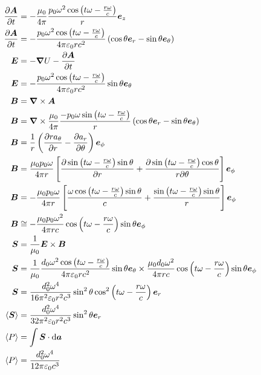 \begin{align}
    \frac{\partial \boldsymbol{A}}{\partial t}&=-\frac{\mu_0}{4\pi}\frac{p_0\omega^2\cos\left(t\omega-\frac{r\omega}{c}\right)}{r}\boldsymbol{e}_z\nonumber\\
    \frac{\partial \boldsymbol{A}}{\partial t}&=-\frac{p_0\omega^2\cos\left(t\omega-\frac{r\omega}{c}\right)}{4\pi\varepsilon_0 rc^2}\left(\cos\theta\boldsymbol{e}_r-\sin\theta\boldsymbol{e}_\theta\right)\nonumber\\
    \boldsymbol{E}&=-\boldsymbol{\nabla}U-\frac{\partial \boldsymbol{A}}{\partial t}\nonumber\\
    \boldsymbol{E}&=-\frac{p_0\omega^2\cos\left(t\omega-\frac{r\omega}{c}\right)}{4\pi\varepsilon_0 rc^2}\sin\theta\boldsymbol{e}_\theta\\
    \boldsymbol{B}&=\boldsymbol{\nabla}\times\boldsymbol{A}\nonumber\\
    \boldsymbol{B}&=\boldsymbol{\nabla}\times\frac{\mu_0}{4\pi}\frac{-p_0\omega\sin\left(t\omega-\frac{r\omega}{c}\right)}{r}\left(\cos\theta\boldsymbol{e}_r-\sin\theta\boldsymbol{e}_\theta\right)\nonumber\\
    \boldsymbol{B}&=\frac{1}{r}\left(\frac{\partial ra_\theta}{\partial r}
    -\frac{\partial a_r}{\partial \theta}\right)\boldsymbol{e}_\phi\nonumber\\
    \boldsymbol{B}&=\frac{\mu_0p_0\omega}{4\pi r}\left[\frac{\partial \sin\left(t\omega-\frac{r\omega}{c}\right)\sin\theta}{\partial r}
    +\frac{\partial \sin\left(t\omega-\frac{r\omega}{c}\right)\cos\theta}{r\partial \theta}\right]\boldsymbol{e}_\phi\nonumber\\
    \boldsymbol{B}&=-\frac{\mu_0p_0\omega}{4\pi r}\left[\frac{\omega \cos\left(t\omega-\frac{r\omega}{c}\right)\sin\theta}{c}
    +\frac{\sin\left(t\omega-\frac{r\omega}{c}\right)\sin\theta}{r}\right]\boldsymbol{e}_\phi\nonumber\\
    \boldsymbol{B}&\cong-\frac{\mu_0p_0\omega^2}{4\pi rc}\cos\left(t\omega-\frac{r\omega}{c}\right)\sin\theta\boldsymbol{e}_\phi\\
    \boldsymbol{S}&=\frac{1}{\mu_0}\boldsymbol{E}\times\boldsymbol{B}\nonumber\\
    \boldsymbol{S}&=\frac{1}{\mu_0}\frac{d_0\omega^2\cos\left(t\omega-\frac{r\omega}{c}\right)}{4\pi\varepsilon_0 rc^2}\sin\theta\boldsymbol{e}_\theta\times\frac{\mu_0d_0\omega^2}{4\pi rc}\cos\left(t\omega-\frac{r\omega}{c}\right)\sin\theta\boldsymbol{e}_\phi\nonumber\\
    \boldsymbol{S}&=\frac{d_0^2\omega^4}{16\pi^2\varepsilon_0 r^2c^3}\sin^2\theta\cos^2\left(t\omega-\frac{r\omega}{c}\right)\boldsymbol{e}_r\\
    \langle\boldsymbol{S} \rangle&=\frac{d_0^2\omega^4}{32\pi^2\varepsilon_0 r^2c^3}\sin^2\theta\boldsymbol{e}_r\\
    \langle P\rangle&=\int\boldsymbol{S}\cdot\dif\boldsymbol{a}\nonumber\\
    \langle P\rangle&=\frac{d_0^2\omega^4}{12\pi\varepsilon_0c^3}
\end{align}
